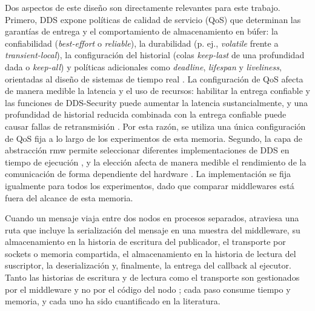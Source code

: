 Dos aspectos de este diseño son directamente relevantes para este trabajo.
Primero, DDS expone políticas de calidad de servicio (QoS) que determinan
las garantías de entrega y el comportamiento de almacenamiento en búfer: la
confiabilidad (\emph{best-effort} o \emph{reliable}), la durabilidad (p.
ej., \emph{volatile} frente a \emph{transient-local}), la configuración del
historial (colas \emph{keep-last} de una profundidad dada o \emph{keep-all})
y políticas adicionales como \emph{deadline}, \emph{lifespan} y
\emph{liveliness}, orientadas al diseño de sistemas de tiempo real
\cite{macenski2022,rosjazzydocs}. La configuración de QoS afecta de manera
medible la latencia y el uso de recursos: habilitar la entrega confiable y
las funciones de DDS-Security puede aumentar la latencia sustancialmente, y
una profundidad de historial reducida combinada con la entrega confiable
puede causar fallas de retransmisión \cite{fernandez2020,kronauer2021}. Por
esta razón, se utiliza una única configuración de QoS fija a lo largo de los
experimentos de esta memoria. Segundo, la capa de abstracción rmw permite
seleccionar diferentes implementaciones de DDS en tiempo de ejecución
\cite{maruyama2016, macenski2022}, y la elección afecta de manera medible el
rendimiento de la comunicación de forma dependiente del hardware
\cite{maruyama2016, kronauer2021, zhang2024}. La implementación se fija
igualmente para todos los experimentos, dado que comparar middlewares está
fuera del alcance de esta memoria.

Cuando un mensaje viaja entre dos nodos en procesos separados, atraviesa una
ruta que incluye la serialización del mensaje en una muestra del middleware,
su almacenamiento en la historia de escritura del publicador, el transporte
por sockets o memoria compartida, el almacenamiento en la historia de lectura
del suscriptor, la deserialización y, finalmente, la entrega del callback al
ejecutor. Tanto las historias de escritura y de lectura como el transporte son
gestionados por el middleware y no por el código del nodo \cite{rosjazzydocs};
cada paso consume tiempo y memoria, y cada uno ha sido cuantificado en la
literatura.

